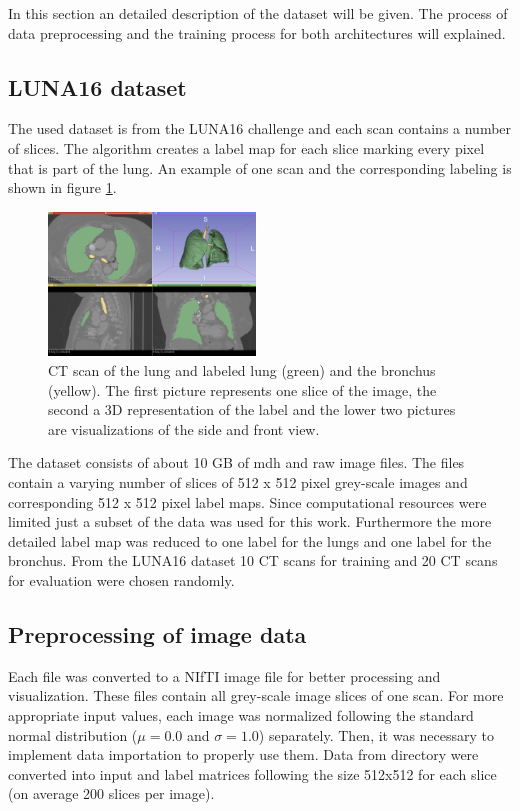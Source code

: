 
In this section an detailed description of the dataset will be given. The process of data preprocessing and the training process for both architectures will explained.

\subsection{LUNA16 dataset}

The used dataset is from the LUNA16 challenge and each scan contains a number of slices. The algorithm creates a label map for each slice marking every pixel that is part of the lung. An example of one scan and the corresponding labeling is shown in figure \ref{scan_picture}.

\begin{figure}[h!]
	\includegraphics[width=0.49\textwidth, angle=0]{files/Fulllayoutprediction.png}
	\caption{CT scan of the lung and labeled lung (green) and the bronchus (yellow). The first picture represents one slice of the image, the second a 3D representation of the label and the lower two pictures are visualizations of the side and front view.}
	\label{scan_picture}
\end{figure}

The dataset consists of about 10 GB of mdh and raw image files. The files contain a varying number of slices of 512 x 512 pixel grey-scale images and corresponding 512 x 512 pixel label maps. Since computational resources were limited just a subset of the data was used for this work. Furthermore the more detailed label map was reduced to one label for the lungs and one label for the bronchus.\newline
From the LUNA16 dataset 10 CT scans for training and 20 CT scans for evaluation were chosen randomly.

\subsection{Preprocessing of image data}
Each file was converted to a NIfTI image file for better processing and visualization. These files contain all grey-scale image slices of one scan. For more appropriate input values, each image was normalized following the standard normal distribution ($\mu = 0.0$ and $\sigma = 1.0$) separately.\newline
Then, it was necessary to implement data importation to properly use them. Data from directory were converted into input and label matrices following the size 512x512 for each slice (on average 200 slices per image).

